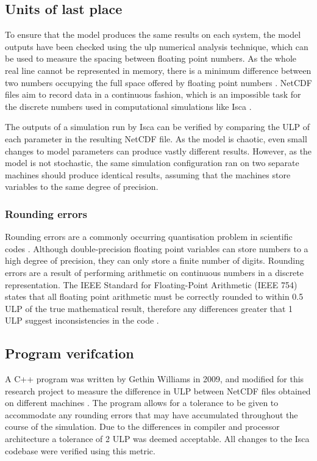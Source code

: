 \documentclass[a4paper,11pt]{report}
\begin{document}
\subsection{Units of last place}
To ensure that the model produces the same results on each system, the model outputs have been checked using the \gls{ulp} numerical analysis technique, which can be used to measure the spacing between floating point numbers. As the whole real line cannot be represented in memory, there is a minimum difference between two numbers occupying the full space offered by floating point numbers \cite{goldberg1991every}. NetCDF files aim to record data in a continuous fashion, which is an impossible task for the discrete numbers used in computational simulations like Isca \cite{rew1990netcdf}.
\par
The outputs of a simulation run by Isca can be verified by comparing the ULP of each parameter in the resulting NetCDF file. As the model is chaotic, even small changes to model parameters can produce vastly different results. However, as the model is not stochastic, the same simulation configuration ran on two separate machines should produce identical results, assuming that the machines store variables to the same degree of precision. 

\subsubsection{Rounding errors}
Rounding errors are a commonly occurring quantisation problem in scientific codes \cite{goldberg1991every}. Although double-precision floating point variables can store numbers to a high degree of precision, they can only store a finite number of digits. Rounding errors are a result of performing arithmetic on continuous numbers in a discrete representation. The IEEE Standard for Floating-Point Arithmetic (IEEE 754) states that all floating point arithmetic must be correctly rounded to within 0.5 ULP of the true mathematical result, therefore any differences greater that 1 ULP suggest inconsistencies in the code \cite{goldberg1991every,ieee1985ieee}. 

\subsection{Program verifcation}
A C++ program was written by Gethin Williams in 2009, and modified for this research project to measure the difference in ULP between NetCDF files obtained on different machines \cite{puma2018}. The program allows for a tolerance to be given to accommodate any rounding errors that may have accumulated throughout the course of the simulation. Due to the differences in compiler and processor architecture a tolerance of 2 ULP was deemed acceptable. All changes to the Isca codebase were verified using this metric.
\end{document}
